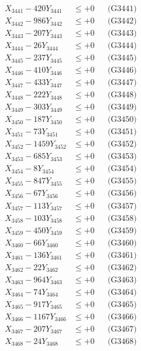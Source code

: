 \documentclass[a4paper,10pt]{article}
\begin{document}
{\begin{align}
\allowbreak
X_{3441} - 420Y_{3441} &\leq +0 && \text{(G3441)} \\
X_{3442} - 986Y_{3442} &\leq +0 && \text{(G3442)} \\
X_{3443} - 207Y_{3443} &\leq +0 && \text{(G3443)} \\
X_{3444} - 26Y_{3444} &\leq +0 && \text{(G3444)} \\
X_{3445} - 237Y_{3445} &\leq +0 && \text{(G3445)} \\
X_{3446} - 410Y_{3446} &\leq +0 && \text{(G3446)} \\
X_{3447} - 433Y_{3447} &\leq +0 && \text{(G3447)} \\
X_{3448} - 222Y_{3448} &\leq +0 && \text{(G3448)} \\
X_{3449} - 303Y_{3449} &\leq +0 && \text{(G3449)} \\
X_{3450} - 187Y_{3450} &\leq +0 && \text{(G3450)} \\
\allowbreak
X_{3451} - 73Y_{3451} &\leq +0 && \text{(G3451)} \\
X_{3452} - 1459Y_{3452} &\leq +0 && \text{(G3452)} \\
X_{3453} - 685Y_{3453} &\leq +0 && \text{(G3453)} \\
X_{3454} - 8Y_{3454} &\leq +0 && \text{(G3454)} \\
X_{3455} - 847Y_{3455} &\leq +0 && \text{(G3455)} \\
X_{3456} - 67Y_{3456} &\leq +0 && \text{(G3456)} \\
X_{3457} - 113Y_{3457} &\leq +0 && \text{(G3457)} \\
X_{3458} - 103Y_{3458} &\leq +0 && \text{(G3458)} \\
X_{3459} - 450Y_{3459} &\leq +0 && \text{(G3459)} \\
X_{3460} - 66Y_{3460} &\leq +0 && \text{(G3460)} \\
\allowbreak
X_{3461} - 136Y_{3461} &\leq +0 && \text{(G3461)} \\
X_{3462} - 22Y_{3462} &\leq +0 && \text{(G3462)} \\
X_{3463} - 964Y_{3463} &\leq +0 && \text{(G3463)} \\
X_{3464} - 74Y_{3464} &\leq +0 && \text{(G3464)} \\
X_{3465} - 917Y_{3465} &\leq +0 && \text{(G3465)} \\
X_{3466} - 1167Y_{3466} &\leq +0 && \text{(G3466)} \\
X_{3467} - 207Y_{3467} &\leq +0 && \text{(G3467)} \\
X_{3468} - 24Y_{3468} &\leq +0 && \text{(G3468)} \\

\end{align}}
\end{document}
